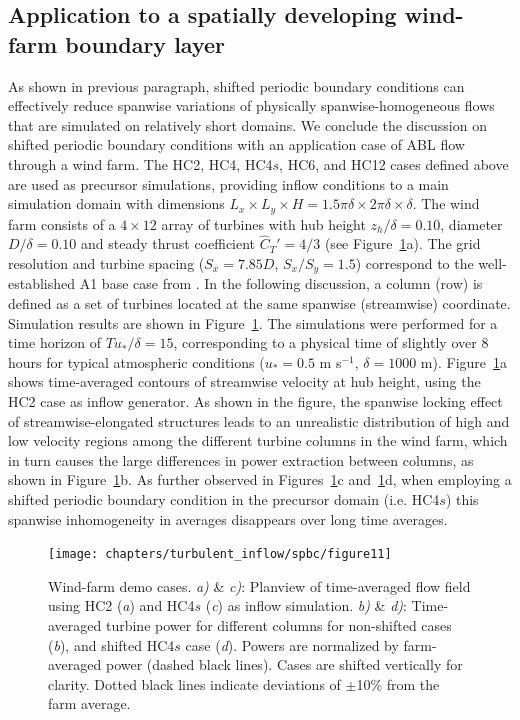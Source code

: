 		
	\subsection{Application to a spatially developing wind-farm boundary layer}\label{sec:inflow_shifted_demo}
	As shown in previous paragraph, shifted periodic boundary conditions can effectively reduce spanwise variations of physically spanwise-homogeneous flows that are simulated on relatively short domains. We conclude the discussion on shifted periodic boundary conditions with an application case of ABL flow through a wind farm. The HC2, HC4, HC4$s$, HC6, and HC12 cases defined above are used as precursor simulations, providing inflow conditions to a main simulation domain with dimensions $L_x \times L_y \times H = 1.5\pi \delta \times 2\pi \delta \times \delta$. The wind farm consists of a $4 \times 12$ array of turbines with hub height $z_h/\delta = 0.10$, diameter $D/\delta = 0.10$ and steady thrust coefficient $\widehat{C}_T' = 4/3$ (see Figure~\ref{fig:WF}a). The grid resolution and turbine spacing ($S_x = 7.85D$, $S_x/S_y = 1.5$) correspond to the well-established A1 base case from \cite{calaf2010large}. In the following discussion, a column (row) is defined as a set of turbines located at the same spanwise (streamwise) coordinate.
	Simulation results are shown in Figure~\ref{fig:WF}. The simulations were performed for a time horizon of $Tu_*/\delta = 15$, corresponding to a physical time of slightly over 8 hours for typical atmospheric conditions ($u_* = 0.5$ m s$^{-1}$, $\delta = 1000$ m). Figure~\ref{fig:WF}a shows time-averaged contours of streamwise velocity at hub height, using the HC2 case as inflow generator. As shown in the figure, the spanwise locking effect of streamwise-elongated structures leads to an unrealistic distribution of high and low velocity regions among the different turbine columns in the wind farm, which in turn causes the large differences in power extraction between columns, as shown in Figure~\ref{fig:WF}b. As further observed in Figures~\ref{fig:WF}c and~\ref{fig:WF}d, when employing a shifted periodic boundary condition in the precursor domain (i.e. HC4$s$) this spanwise inhomogeneity in averages disappears over long time averages. 
	
	\begin{figure}
		\centering
		\texttt{[image: chapters/turbulent\_inflow/spbc/figure11]}
		\caption{Wind-farm demo cases. \emph{a)} \& \emph{c)}: Planview of time-averaged flow field using HC2 (\emph{a}) and HC4$s$ (\emph{c}) as inflow simulation. \emph{b)} \& \emph{d)}: Time-averaged turbine power for different columns for non-shifted cases (\emph{b}), and shifted HC4$s$ case (\emph{d}). Powers are normalized by farm-averaged power (dashed black lines). Cases are shifted vertically for clarity. Dotted black lines indicate deviations of $\pm$10\% from the farm average.}
		\label{fig:WF}
	\end{figure}
	
